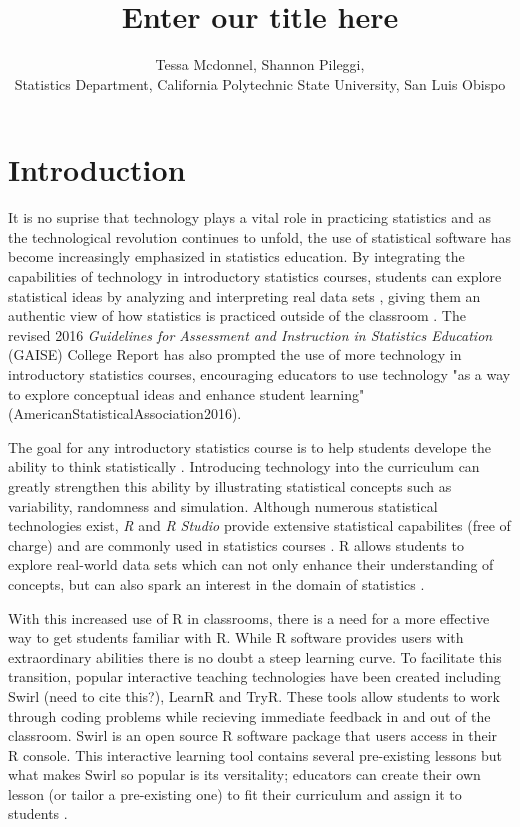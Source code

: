 \documentclass{tise_style}
\title{Enter our title here}
\author{Tessa Mcdonnel, Shannon Pileggi,  \\Statistics Department, California Polytechnic State University, San Luis Obispo}
\begin{document}
\section{Introduction}

It is no suprise that technology plays a vital role in practicing statistics and as the technological revolution continues to 
unfold, the use of statistical software has become increasingly emphasized in statistics education. By integrating the 
capabilities of technology in introductory statistics courses, students can explore statistical ideas by analyzing and 
interpreting real data sets \citep{Chance2007}, giving them an authentic view of how statistics is practiced outside of the 
classroom \citep{Wang2017}. The revised 2016 \textit{Guidelines for Assessment and Instruction in Statistics Education} 
(GAISE) College Report has also prompted the use of more technology in introductory statistics courses, encouraging educators 
to use technology "as a way to explore conceptual ideas and enhance student learning" (AmericanStatisticalAssociation2016).

The goal for any introductory statistics course is to help students develope the ability to think statistically 
\citep{AmericanStatisticalAssociation2016}. 
Introducing technology into the curriculum can greatly strengthen this ability by illustrating statistical concepts such as
variability, randomness and simulation. Although numerous statistical technologies exist, \textit{R} and \textit{R Studio} 
provide extensive statistical capabilites (free of charge) and are commonly used in statistics courses \citep{Chance2007}. R 
allows students to explore real-world data sets which can not only enhance their understanding of concepts, but can also spark
an interest in the domain of statistics \citep{Wang2017}.

With this increased use of R in classrooms, there is a need for a more effective way to get students familiar with R. While R
software provides users with extraordinary abilities there is no doubt a steep learning curve. To facilitate this transition,
popular interactive teaching technologies have been created including Swirl (need to cite this?), LearnR and TryR. These tools 
allow students to work through coding problems while recieving immediate feedback in and out of the classroom. Swirl is an open source R software package 
that users access in their R console. This interactive learning tool contains several pre-existing lessons but what makes 
Swirl so popular is its versitality; educators can create their own lesson (or tailor a pre-existing one) to fit their 
curriculum and assign it to students \citep{Carchedi2014}. 
\end{document}
